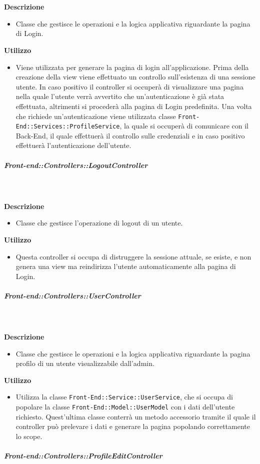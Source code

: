         \textbf{\\ \\ Descrizione} 
          \begin{itemize}
            \item[] Classe che gestisce le operazioni e la logica applicativa riguardante la pagina di Login.
          \end{itemize}      
        \textbf{Utilizzo}  
          \begin{itemize}
            \item[] Viene utilizzata per generare la pagina di login all'applicazione. Prima della creazione della view viene effettuato un controllo sull'esistenza di una sessione utente. In caso positivo il controller si occuperà di visualizzare una pagina nella quale l'utente verrà avvertito che un'autenticazione è già stata effettuata, altrimenti si procederà alla pagina di Login predefinita. Una volta che richiede un'autenticazione viene utilizzata classe \texttt{Front-End::Services::ProfileService}, la quale si occuperà di comunicare con il Back-End, il quale effettuerà il controllo sulle credenziali e in caso positivo effettuerà l'autenticazione dell'utente.
          \end{itemize}
      \subparagraph{Front-end::Controllers::LogoutController}
        
        \textbf{\\ \\ Descrizione} 
          \begin{itemize}
            \item[] Classe che gestisce l'operazione di logout di un utente.
          \end{itemize}      
        \textbf{Utilizzo}  
          \begin{itemize}
            \item[] Questa controller si occupa di distruggere la sessione attuale, se esiste, e non genera una view ma reindirizza l'utente automaticamente alla pagina di Login.
          \end{itemize}
      \subparagraph{Front-end::Controllers::UserController}
        
        \textbf{\\ \\ Descrizione} 
          \begin{itemize}
            \item[] Classe che gestisce le operazioni e la logica applicativa riguardante la pagina profilo di un utente visualizzabile dall'admin.
          \end{itemize}      
        \textbf{Utilizzo}  
          \begin{itemize}
            \item[] Utilizza la classe \texttt{Front-End::Service::UserService}, che si occupa di popolare la classe \texttt{Front-End::Model::UserModel} con i dati dell'utente richiesto. Quest'ultima classe conterrà un metodo accessorio tramite il quale il controller può prelevare i dati e generare la pagina popolando correttamente lo scope.
          \end{itemize}
      \subparagraph{Front-end::Controllers::ProfileEditController}
        
